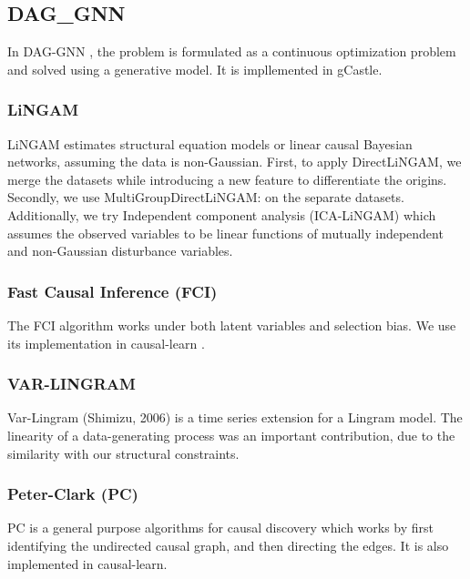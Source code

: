 \documentclass{article}
\begin{document}
    \subsection{DAG\_GNN}
    In DAG-GNN \cite{DAGGNN}, the problem is formulated as a continuous optimization problem and solved using a generative model. It is impllemented in gCastle. 

    \subsubsection{LiNGAM}
    LiNGAM estimates structural equation models or linear causal Bayesian networks, assuming the data is non-Gaussian.
    First, to apply DirectLiNGAM\cite{lingam}, we merge the datasets while introducing a new feature to differentiate the origins. 
    Secondly, we use MultiGroupDirectLiNGAM: \cite{multilingam} on the separate datasets.
    Additionally, we try Independent component analysis (ICA-LiNGAM)\cite{ICALINGAM} which assumes the observed variables to be linear functions of mutually independent and non-Gaussian disturbance variables.

    \subsubsection{Fast Causal Inference (FCI)}
    The FCI algorithm \cite{FCI} works under both latent variables and selection bias. We use its implementation in causal-learn \cite{Causallearn}.

	
	\subsubsection{VAR-LINGRAM}
	
	Var-Lingram (Shimizu, 2006)	 is a time series extension for a Lingram model. The linearity of a data-generating process was an important contribution, due to the similarity with our structural constraints.    


    \subsubsection{Peter-Clark (PC)}
    PC \cite{PC} is a general purpose algorithms for causal discovery which works by first identifying the undirected causal graph, and then directing the edges. It is also implemented in causal-learn.
    
\end{document}
